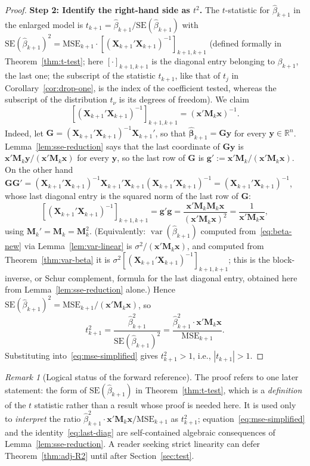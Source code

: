 \documentclass[14pt]{extarticle}
\theoremstyle{plain}
\theoremstyle{definition}
\theoremstyle{remark}
\newtheorem{remark}[theorem]{Remark}
\DeclareMathOperator\var{var}
\newcommand{\MSE}{\mathrm{MSE}}
\newcommand{\SE}{\mathrm{SE}}
\newcommand{\bX}{\mathbf{X}}
\newcommand{\by}{\mathbf{y}}
\newcommand{\bx}{\mathbf{x}}
\def\bb{\boldsymbol{\beta}}
\newcommand{\bM}{\mathbf{M}}
\newcommand{\Real}{\mathbb{R}}
\begin{document}
\begin{proof}
\textbf{Step 2: Identify the right-hand side as $t^2$.}
The $t$-statistic for $\hat{\beta}_{k+1}$ in the enlarged model is $t_{k+1} = \hat{\beta}_{k+1}/\SE(\hat{\beta}_{k+1})$ with $\SE(\hat{\beta}_{k+1})^2 = \MSE_{k+1}\cdot [(\bX_{k+1}'\bX_{k+1})^{-1}]_{k+1,k+1}$ (defined formally in Theorem~\ref{thm:t-test}; here $[\cdot]_{k+1,k+1}$ is the diagonal entry belonging to $\beta_{k+1}$, the last one; the subscript of the statistic $t_{k+1}$, like that of $t_j$ in Corollary~\ref{cor:drop-one}, is the index of the coefficient tested, whereas the subscript of the distribution $t_\nu$ is its degrees of freedom). We claim
\begin{equation}\label{eq:last-diag}
[(\bX_{k+1}'\bX_{k+1})^{-1}]_{k+1,k+1} = (\bx'\bM_k\bx)^{-1}.
\end{equation}
Indeed, let $\mathbf{G} = (\bX_{k+1}'\bX_{k+1})^{-1}\bX_{k+1}'$, so that $\hat{\bb}_{k+1} = \mathbf{G}\by$ for every $\by \in \Real^n$. Lemma~\ref{lem:sse-reduction} says that the last coordinate of $\mathbf{G}\by$ is $\bx'\bM_k\by/(\bx'\bM_k\bx)$ for every $\by$, so the last row of $\mathbf{G}$ is $\mathbf{g}' := \bx'\bM_k/(\bx'\bM_k\bx)$. On the other hand $\mathbf{G}\mathbf{G}' = (\bX_{k+1}'\bX_{k+1})^{-1}\bX_{k+1}'\bX_{k+1}(\bX_{k+1}'\bX_{k+1})^{-1} = (\bX_{k+1}'\bX_{k+1})^{-1}$, whose last diagonal entry is the squared norm of the last row of $\mathbf{G}$:
\[
[(\bX_{k+1}'\bX_{k+1})^{-1}]_{k+1,k+1} = \mathbf{g}'\mathbf{g} = \frac{\bx'\bM_k\bM_k\bx}{(\bx'\bM_k\bx)^2} = \frac{1}{\bx'\bM_k\bx},
\]
using $\bM_k' = \bM_k = \bM_k^2$. (Equivalently: $\var(\hat{\beta}_{k+1})$ computed from~\eqref{eq:beta-new} via Lemma~\ref{lem:var-linear} is $\sigma^2/(\bx'\bM_k\bx)$, and computed from Theorem~\ref{thm:var-beta} it is $\sigma^2[(\bX_{k+1}'\bX_{k+1})^{-1}]_{k+1,k+1}$; this is the block-inverse, or Schur complement, formula for the last diagonal entry, obtained here from Lemma~\ref{lem:sse-reduction} alone.) Hence $\SE(\hat{\beta}_{k+1})^2 = \MSE_{k+1}/(\bx'\bM_k\bx)$, so
\[
t_{k+1}^2 = \frac{\hat{\beta}_{k+1}^2}{\SE(\hat{\beta}_{k+1})^2} = \frac{\hat{\beta}_{k+1}^2\cdot\bx'\bM_k\bx}{\MSE_{k+1}}.
\]
Substituting into~\eqref{eq:mse-simplified} gives $t_{k+1}^2 > 1$, i.e., $|t_{k+1}| > 1$.
\end{proof}

\begin{remark}[Logical status of the forward reference]\label{rem:forward-adjR2}
The proof refers to one later statement: the form of $\SE(\hat{\beta}_{k+1})$ in Theorem~\ref{thm:t-test}, which is a \emph{definition} of the $t$ statistic rather than a result whose proof is needed here. It is used only to \emph{interpret} the ratio $\hat{\beta}_{k+1}^2\cdot\bx'\bM_k\bx/\MSE_{k+1}$ as $t_{k+1}^2$; equation~\eqref{eq:mse-simplified} and the identity~\eqref{eq:last-diag} are self-contained algebraic consequences of Lemma~\ref{lem:sse-reduction}. A reader seeking strict linearity can defer Theorem~\ref{thm:adj-R2} until after Section~\ref{sec:test}.
\end{remark}
\end{document}
